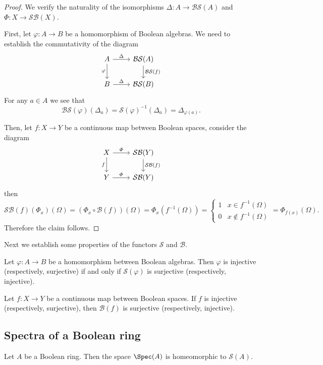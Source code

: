 \begin{proof}
We verify the naturality of the isomorphisms $\Delta:A\to\mathcal{B}\mathcal{S}(A)$ and $\varPhi:X\to\mathcal{S}\mathcal{B}(X)$.\par
First, let $\varphi:A\to B$ be a homomorphism 
of Boolean algebras. We need to establish the commutativity of the diagram
\[\begin{tikzcd}
A\ar[r,"\Delta"]\ar[d,swap,"\varphi"]&\mathcal{B}\mathcal{S}(A)\ar[d,"\mathcal{B}\mathcal{S}(f)"]\\
B\ar[r,"\Delta"]&\mathcal{B}\mathcal{S}(B)
\end{tikzcd}\]
For any $a\in A$ we see that
\[\mathcal{B}\mathcal{S}(\varphi)(\Delta_a)=\mathcal{S}(\varphi)^{-1}(\Delta_a)=\Delta_{\varphi(a)}.\]

Then, let $f:X\to Y$ be a continuous map between Boolean spaces, consider the diagram
\[\begin{tikzcd}
X\ar[r,"\varPhi"]\ar[d,swap,"f"]&\mathcal{S}\mathcal{B}(Y)\ar[d,"\mathcal{S}\mathcal{B}(f)"]\\
Y\ar[r,"\varPhi"]&\mathcal{S}\mathcal{B}(Y)
\end{tikzcd}\]then
\[\mathcal{S}\mathcal{B}(f)(\varPhi_x)(\Omega)=(\varPhi_x\circ\mathcal{B}(f))(\Omega)=\varPhi_x(f^{-1}(\Omega))=\begin{cases}
1&x\in f^{-1}(\Omega)\\
0&x\notin f^{-1}(\Omega)
\end{cases}=\varPhi_{f(x)}(\Omega).\]
Therefore the claim follows.
\end{proof}
Next we establish some properties of the functors $\mathcal{S}$ and $\mathcal{B}$.
\begin{lemma}
Let $\varphi:A\to B$ be a homomorphism between Boolean algebras. Then $\varphi$ is injective (respectively, surjective) if and only if $\mathcal{S}(\varphi)$ is surjective 
(respectively, injective).
\end{lemma}
\begin{lemma}
Let $f:X\to Y$ be a continuous map between Boolean spaces. If $f$ is injective (respectively, surjective), then $\mathcal{B}(f)$ is surjective (respectively, injective).
\end{lemma}
\subsection{Spectra of a Boolean ring}
\begin{proposition}
Let $A$ be a Boolean ring. Then the space $\Spec(A)$ is homeomorphic to $\mathcal{S}(A)$.
\end{proposition}